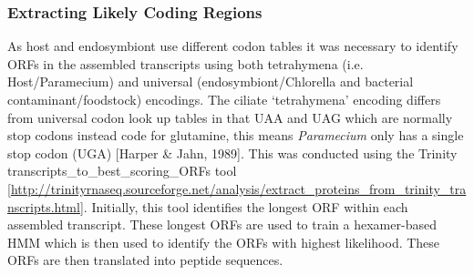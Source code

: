 \subsubsection{Extracting Likely Coding Regions}
As host and endosymbiont use different codon tables it was necessary to identify ORFs in the assembled transcripts using both tetrahymena (i.e. Host/Paramecium) and universal (endosymbiont/Chlorella and bacterial contaminant/foodstock) encodings.  
The ciliate `tetrahymena' encoding differs from universal codon look up tables in that UAA and UAG which are normally stop codons instead code for glutamine, this means \textit{Paramecium} only has a single stop codon (UGA) [Harper \& Jahn, 1989].
This was conducted using the Trinity transcripts\_to\_best\_scoring\_ORFs tool [\url{http://trinityrnaseq.sourceforge.net/analysis/extract_proteins_from_trinity_transcripts.html}].  
Initially, this tool identifies the longest ORF within each assembled transcript.  
These longest ORFs are used to train a hexamer-based HMM which is then used to identify the ORFs with highest likelihood.  
These ORFs are then translated into peptide sequences. 

